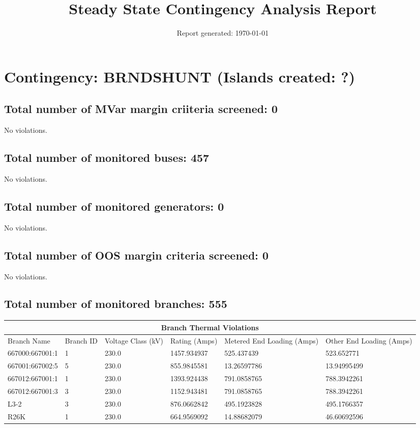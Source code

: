 \documentclass{article}%
\title{Steady State Contingency Analysis Report\vspace{-3ex}}%
\date{Report generated: \today\vspace{-2ex}}%
\begin{document}
%
\normalsize%
\maketitle%
\section*{Contingency: BRNDSHUNT (Islands created: ?)}%
\label{sec:ContingencyBRNDSHUNT(Islandscreated?)}%
\subsection*{Total number of MVar margin criiteria screened: 0}%
\label{subsec:TotalnumberofMVarmargincriiteriascreened0}%
No violations.

%
\subsection*{Total number of monitored buses: 457}%
\label{subsec:Totalnumberofmonitoredbuses457}%
No violations.

%
\subsection*{Total number of monitored generators: 0}%
\label{subsec:Totalnumberofmonitoredgenerators0}%
No violations.

%
\subsection*{Total number of OOS margin criteria screened: 0}%
\label{subsec:TotalnumberofOOSmargincriteriascreened0}%
No violations.

%
\subsection*{Total number of monitored branches: 555}%
\label{subsec:Totalnumberofmonitoredbranches555}%
\begin{tabularx}{\textwidth}{| X | X | X | X | X | X |}%
\hline%
\multicolumn{6}{|c|}{Branch Thermal Violations}\\%
\hline%
Branch Name&Branch ID&Voltage Class (kV)&Rating (Amps)&Metered End Loading (Amps)&Other End Loading (Amps)\\%
\hline%
667000:667001:1&1&230.0&1457.934937&525.437439&523.652771\\%
\hline%
\hline%
667001:667002:5&5&230.0&855.9845581&13.26597786&13.94995499\\%
\hline%
\hline%
667012:667001:1&1&230.0&1393.924438&791.0858765&788.3942261\\%
\hline%
\hline%
667012:667001:3&3&230.0&1152.943481&791.0858765&788.3942261\\%
\hline%
\hline%
L3{-}2&3&230.0&876.0662842&495.1923828&495.1766357\\%
\hline%
\hline%
R26K&1&230.0&664.9569092&14.88682079&46.60692596\\%
\hline%
\end{tabularx}
\end{document}

